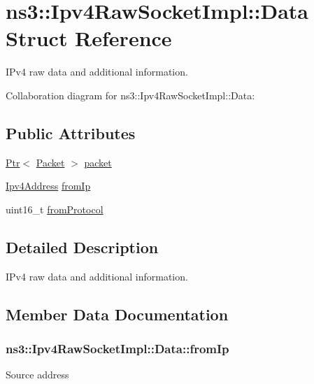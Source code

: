 \hypertarget{structns3_1_1Ipv4RawSocketImpl_1_1Data}{}\section{ns3\+:\+:Ipv4\+Raw\+Socket\+Impl\+:\+:Data Struct Reference}
\label{structns3_1_1Ipv4RawSocketImpl_1_1Data}


I\+Pv4 raw data and additional information.  




Collaboration diagram for ns3\+:\+:Ipv4\+Raw\+Socket\+Impl\+:\+:Data\+:
\subsection*{Public Attributes}
\begin{DoxyCompactItemize}
\item 
\hyperlink{classns3_1_1Ptr}{Ptr}$<$ \hyperlink{classns3_1_1Packet}{Packet} $>$ \hyperlink{structns3_1_1Ipv4RawSocketImpl_1_1Data_afbbbc75b177a582c5f3ecaddc6245ba3}{packet}
\item 
\hyperlink{classns3_1_1Ipv4Address}{Ipv4\+Address} \hyperlink{structns3_1_1Ipv4RawSocketImpl_1_1Data_a6170ee5cc6a3594cac5ece8f4a8a156f}{from\+Ip}
\item 
uint16\+\_\+t \hyperlink{structns3_1_1Ipv4RawSocketImpl_1_1Data_a95ad24e97c6e8e0a0136c48ff0556b14}{from\+Protocol}
\end{DoxyCompactItemize}


\subsection{Detailed Description}
I\+Pv4 raw data and additional information. 

\subsection{Member Data Documentation}
\subsubsection[{\texorpdfstring{from\+Ip}{fromIp}}]{ ns3\+::\+Ipv4\+Raw\+Socket\+Impl\+::\+Data\+::from\+Ip}\hypertarget{structns3_1_1Ipv4RawSocketImpl_1_1Data_a6170ee5cc6a3594cac5ece8f4a8a156f}{}\label{structns3_1_1Ipv4RawSocketImpl_1_1Data_a6170ee5cc6a3594cac5ece8f4a8a156f}
Source address 
